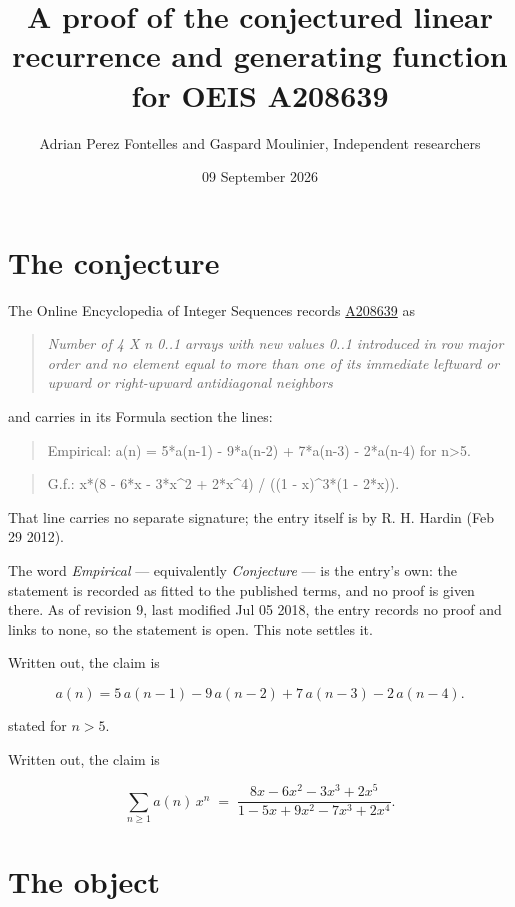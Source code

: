 \documentclass[11pt]{article}
\title{A proof of the conjectured linear recurrence and generating function for OEIS A208639}
\author{Adrian Perez Fontelles and Gaspard Moulinier, Independent researchers}
\date{09 September 2026}
\theoremstyle{definition}
\begin{document}
\maketitle
\section{The conjecture}

The Online Encyclopedia of Integer Sequences records \href{https://oeis.org/A208639}{A208639} as

\begin{quote}\itshape Number of 4 X n 0..1 arrays with new values 0..1 introduced in row major order and no element equal to more than one of its immediate leftward or upward or right-upward antidiagonal neighbors\end{quote}

and carries in its Formula section the lines:

\begin{quote}\ttfamily Empirical: a(n) = 5*a(n-1) - 9*a(n-2) + 7*a(n-3) - 2*a(n-4) for n>5.\end{quote}

\begin{quote}\ttfamily G.f.: x*(8 - 6*x - 3*x\textasciicircum{}2 + 2*x\textasciicircum{}4) / ((1 - x)\textasciicircum{}3*(1 - 2*x)).\end{quote}

That line carries no separate signature; the entry itself is by R. H. Hardin (Feb 29 2012).

The word {\itshape Empirical} --- equivalently {\itshape Conjecture} --- is the entry's own: the statement is recorded as fitted to the published terms, and no proof is given there. As of revision 9, last modified Jul 05 2018, the entry records no proof and links to none, so the statement is open. This note settles it.

Written out, the claim is

\[a(n) = 5\,a(n-1) - 9\,a(n-2) + 7\,a(n-3) - 2\,a(n-4).\]

stated for $n > 5$.

Written out, the claim is

\[\sum_{n \ge 1} a(n)\,x^n \;=\; \frac{8x - 6x^{2} - 3x^{3} + 2x^{5}}{1 - 5x + 9x^{2} - 7x^{3} + 2x^{4}}.\]

\section{The object}
\end{document}
